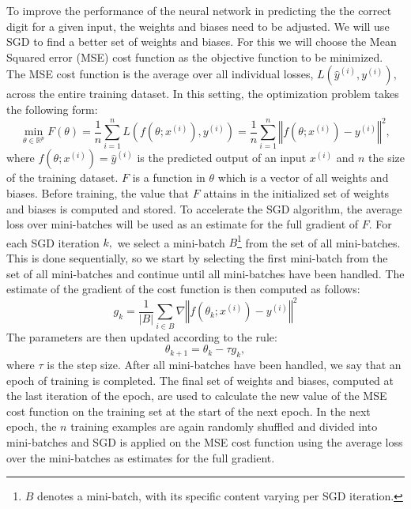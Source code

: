 To improve the performance of the neural network in predicting the the correct digit for a given input, the weights and biases need to be adjusted. We will use SGD to find a better set of weights and biases. For this we will choose the Mean Squared error (MSE) cost function as the objective function to be minimized. The MSE cost function is the average over all individual losses, $L(\hat{y}^{(i)},y^{(i)}),$ across the entire training dataset. In this setting, the optimization problem takes the following form:
\begin{equation*}\tag{6.4.2.2}\label{MSE_cost_fun}
\underset{\theta\in \mathbb{R}^{p}}{\min}F(\theta) = \frac{1}{n}\sum_{i=1}^{n}L(f(\theta;x^{(i)}), y^{(i)}) = \frac{1}{n}\sum_{i=1}^{n}\left\Vert f(\theta;x^{(i)}) - y^{(i)}\right\Vert^{2}, 
\end{equation*}
where $f(\theta;x^{(i)})=\hat{y}^{(i)}$ is the predicted output of an input $x^{(i)}$ and $n$ the size of the training dataset. $F$ is a function in $\theta$ which is a vector of all weights and biases. Before training, the value that $F$ attains in the initialized set of weights and biases is computed and stored. To accelerate the SGD algorithm, the average loss over mini-batches will be used as an estimate for the full gradient of $F.$ For each SGD iteration $k,$ we select a mini-batch $B$\footnote{$B$ denotes a mini-batch, with its specific content varying per SGD iteration.} from the set of all mini-batches. This is done sequentially, so we start by selecting the first mini-batch from the set of all mini-batches and continue until all mini-batches have been handled. The estimate of the gradient of the cost function is then computed as follows:
\begin{equation}\tag{6.4.2.3}
g_{k} = \frac{1}{|B|}\sum_{i\in B} \nabla \left\Vert f(\theta_{k};x^{(i)}) - y^{(i)}\right\Vert^{2}
\end{equation}
The parameters are then updated according to the rule:
\begin{equation}\tag{6.4.2.4}
\theta_{k+1} = \theta_{k} - \tau g_{k},
\end{equation}
where $\tau$ is the step size. After all mini-batches have been handled, we say that an epoch of training is completed. The final set of weights and biases, computed at the last iteration of the epoch, are used to calculate the new value of the MSE cost function on the training set at the start of the next epoch.
In the next epoch, the $n$ training examples are again randomly shuffled and divided into mini-batches and SGD is applied on the MSE cost function using the average loss over the mini-batches as estimates for the full gradient.
